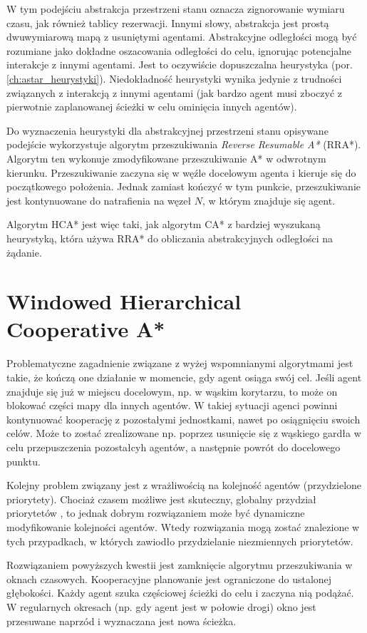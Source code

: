 W tym podejściu abstrakcja przestrzeni stanu oznacza zignorowanie wymiaru czasu, jak również tablicy rezerwacji.
Innymi słowy, abstrakcja jest prostą dwuwymiarową mapą z usuniętymi agentami. Abstrakcyjne odległości mogą być rozumiane jako dokładne oszacowania odległości do celu, ignorując potencjalne interakcje z innymi agentami. Jest to oczywiście dopuszczalna heurystyka (por. \ref{ch:astar_heurystyki}). Niedokładność heurystyki wynika jedynie z trudności związanych z interakcją z innymi agentami (jak bardzo agent musi zboczyć z pierwotnie zaplanowanej ścieżki w celu ominięcia innych agentów).

Do wyznaczenia heurystyki dla abstrakcyjnej przestrzeni stanu opisywane podejście wykorzystuje algorytm przeszukiwania {\it Reverse Resumable A*} (RRA*).
Algorytm ten wykonuje zmodyfikowane przeszukiwanie A* w odwrotnym kierunku. Przeszukiwanie zaczyna się w węźle docelowym agenta i kieruje się do początkowego położenia. Jednak zamiast kończyć w tym punkcie, przeszukiwanie jest kontynuowane do natrafienia na węzeł $N$, w którym znajduje się agent.

Algorytm HCA* jest więc taki, jak algorytm CA* z bardziej wyszukaną heurystyką, która używa RRA* do obliczania abstrakcyjnych odległości na żądanie.

\section{Windowed Hierarchical Cooperative A*}
\label{ch:whca}
Problematyczne zagadnienie związane z wyżej wspomnianymi algorytmami jest takie, że kończą one działanie w momencie, gdy agent osiąga swój cel. Jeśli agent znajduje się już w miejscu docelowym, np. w wąskim korytarzu, to może on blokować części mapy dla innych agentów. W takiej sytuacji agenci powinni kontynuować kooperację z pozostałymi jednostkami, nawet po osiągnięciu swoich celów. Może to zostać zrealizowane np. poprzez usunięcie się z wąskiego gardła w celu przepuszczenia pozostałcyh agentów, a następnie powrót do docelowego punktu. \cite{cooppath}

Kolejny problem związany jest z wrażliwością na kolejność agentów (przydzielone priorytety). Chociaż czasem możliwe jest skuteczny, globalny przydział priorytetów \cite{latombe}, to jednak dobrym rozwiązaniem może być dynamiczne modyfikowanie kolejności agentów. Wtedy rozwiązania mogą zostać znalezione w tych przypadkach, w których zawiodło przydzielanie niezmiennych priorytetów. \cite{cooppath}

Rozwiązaniem powyższych kwestii jest zamknięcie algorytmu przeszukiwania w oknach czasowych.
Kooperacyjne planowanie jest ograniczone do ustalonej głębokości. Każdy agent szuka częściowej ścieżki do celu i zaczyna nią podążać. W regularnych okresach (np. gdy agent jest w połowie drogi) okno jest przesuwane naprzód i wyznaczana jest nowa ścieżka.

